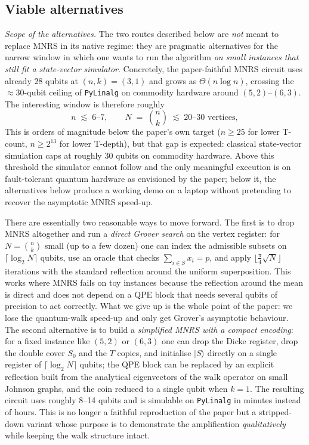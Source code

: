 \documentclass[11pt,a4paper]{article}
\begin{document}
\subsection{Viable alternatives}

\emph{Scope of the alternatives.} The two routes described below are
\emph{not} meant to replace MNRS in its native regime: they are
pragmatic alternatives for the narrow window in which one wants to
run the algorithm \emph{on small instances that still fit a
state-vector simulator}. Concretely, the paper-faithful MNRS
circuit uses already $28$ qubits at $(n,k)=(3,1)$ and grows as
$\Theta(n \log n)$, crossing the $\approx 30$-qubit ceiling of
\texttt{PyLinalg} on commodity hardware around $(5,2)$--$(6,3)$. The
interesting window is therefore roughly
\[
n \;\lesssim\; 6\text{--}7,
\qquad
N \;=\; \binom{n}{k} \;\lesssim\; 20\text{--}30 \text{ vertices},
\]
This is orders of magnitude below the paper's own target
($n \ge 25$ for lower T-count, $n \ge 2^{13}$ for lower T-depth),
but that gap is expected: classical state-vector simulation caps at
roughly 30 qubits on commodity hardware. Above this threshold the
simulator cannot follow and the only meaningful execution is on
fault-tolerant quantum hardware as envisioned by the paper; below
it, the alternatives below produce a working demo on a laptop
without pretending to recover the asymptotic MNRS speed-up.

There are essentially two reasonable ways to move forward. The first
is to drop MNRS altogether and run a \emph{direct Grover search} on
the vertex register: for $N=\binom{n}{k}$ small (up to a few dozen)
one can index the admissible subsets on $\lceil\log_2 N\rceil$ qubits,
use an oracle that checks $\sum_{i\in S}x_i=p$, and apply
$\lfloor \tfrac{\pi}{4}\sqrt{N}\rfloor$ iterations with the standard
reflection around the uniform superposition. This works where MNRS
fails on toy instances because the reflection around the mean is
direct and does not depend on a QPE block that needs several qubits
of precision to act correctly. What we give up is the whole point of
the paper: we lose the quantum-walk speed-up and only get Grover's
asymptotic behaviour. The second alternative is to build a
\emph{simplified MNRS with a compact encoding}: for a fixed instance
like $(5,2)$ or $(6,3)$ one can drop the Dicke register, drop the
double cover $S_0$ and the $T$ copies, and initialise $|S\rangle$
directly on a single register of $\lceil\log_2 N\rceil$ qubits; the
QPE block can be replaced by an explicit reflection built from the
analytical eigenvectors of the walk operator on small Johnson graphs,
and the coin reduced to a single qubit when $k=1$. The resulting
circuit uses roughly 8--14 qubits and is simulable on
\texttt{PyLinalg} in minutes instead of hours. This is no longer a
faithful reproduction of the paper but a stripped-down variant whose
purpose is to demonstrate the amplification \emph{qualitatively}
while keeping the walk structure intact.
\end{document}
